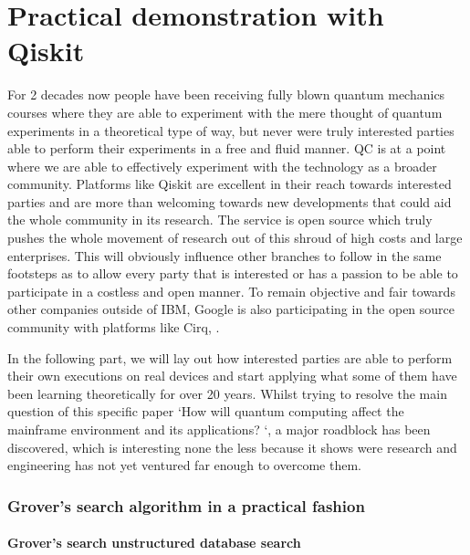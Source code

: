 
\chapter{Practical demonstration with Qiskit}
\label{ch:practical}

For 2 decades now people have been receiving fully blown quantum mechanics courses where they are able to experiment with the mere thought of quantum experiments in a theoretical type of way, but never were truly interested parties able to perform their experiments in a free and fluid manner. QC is at a point where we are able to effectively experiment with the technology as a broader community. Platforms like Qiskit are excellent in their reach towards interested parties and are more than welcoming towards new developments that could aid the whole community in its research. The service is open source which truly pushes the whole movement of research out of this shroud of high costs and large enterprises. This will obviously influence other branches to follow in the same footsteps as to allow every party that is interested or has a passion to be able to participate in a costless and open manner. To remain objective and fair towards other companies outside of IBM, Google is also participating in the open source community with platforms like Cirq, \textcite{Cirq}. 

In the following part, we will lay out how interested parties are able to perform their own executions on real devices and start applying what some of them have been learning theoretically for over 20 years. Whilst trying to resolve the main question of this specific paper `How will quantum computing affect the mainframe environment and its applications? `, a major roadblock has been discovered, which is interesting none the less because it shows were research and engineering has not yet ventured far enough to overcome them. 


\subsection{Grover's search algorithm in a practical fashion}

\subsubsection{Grover's search unstructured database search}

